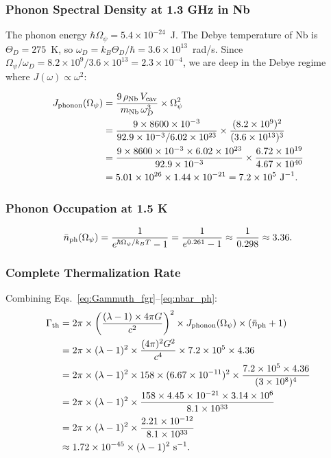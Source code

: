 \documentclass[11pt,twocolumn]{article}
\newcommand{\lam}{\lambda}
\newcommand{\Opsi}{\Omega_\psi}
\newcommand{\Gammath}{\Gamma_{\rm th}}
\newcommand{\nbar}{\bar{n}}
\begin{document}
\subsubsection{Phonon Spectral Density at 1.3 GHz in Nb}

The phonon energy $\hbar\Opsi = 5.4\times10^{-24}$~J. The Debye temperature
of Nb is $\Theta_D = 275$~K, so $\omega_D = k_B\Theta_D/\hbar = 3.6\times10^{13}$~rad/s.
Since $\Opsi/\omega_D = 8.2\times10^9/3.6\times10^{13} = 2.3\times10^{-4}$,
we are deep in the Debye regime where $J(\omega) \propto \omega^2$:

\begin{align}
J_{\rm phonon}(\Opsi) &= \frac{9\,\rho_{\rm Nb}\,V_{\rm cav}}{m_{\rm Nb}\,\omega_D^3}
\times\Opsi^2
\nonumber\\
&= \frac{9\times8600\times10^{-3}}{92.9\times10^{-3}/6.02\times10^{23}}
\times\frac{(8.2\times10^9)^2}{(3.6\times10^{13})^3}
\nonumber\\
&= \frac{9\times8600\times10^{-3}\times6.02\times10^{23}}{92.9\times10^{-3}}
\times\frac{6.72\times10^{19}}{4.67\times10^{40}}
\nonumber\\
&= 5.01\times10^{26}\times1.44\times10^{-21}
= 7.2\times10^{5}~\text{J}^{-1}.
\label{eq:Jphonon}
\end{align}

\subsubsection{Phonon Occupation at 1.5 K}

\begin{equation}
\nbar_{\rm ph}(\Opsi) = \frac{1}{e^{\hbar\Opsi/k_BT}-1}
= \frac{1}{e^{0.261}-1} \approx \frac{1}{0.298} \approx 3.36.
\label{eq:nbar_ph}
\end{equation}

\subsubsection{Complete Thermalization Rate}

Combining Eqs.~\eqref{eq:Gammuth_fgr}--\eqref{eq:nbar_ph}:
\begin{align}
\Gammath &= 2\pi\times\left(\frac{(\lam-1)\times4\pi G}{c^2}\right)^2
\times J_{\rm phonon}(\Opsi)\times(\nbar_{\rm ph}+1)
\nonumber\\
&= 2\pi\times(\lam-1)^2\times\frac{(4\pi)^2 G^2}{c^4}
\times7.2\times10^5\times4.36
\nonumber\\
&= 2\pi\times(\lam-1)^2\times158\times(6.67\times10^{-11})^2
\times\frac{7.2\times10^5\times4.36}{(3\times10^8)^4}
\nonumber\\
&= 2\pi\times(\lam-1)^2
\times\frac{158\times4.45\times10^{-21}\times3.14\times10^6}
{8.1\times10^{33}}
\nonumber\\
&= 2\pi\times(\lam-1)^2\times\frac{2.21\times10^{-12}}{8.1\times10^{33}}
\nonumber\\
&\approx 1.72\times10^{-45}\times(\lam-1)^2~\text{s}^{-1}.
\label{eq:Gammuth_result}
\end{align}
\end{document}

